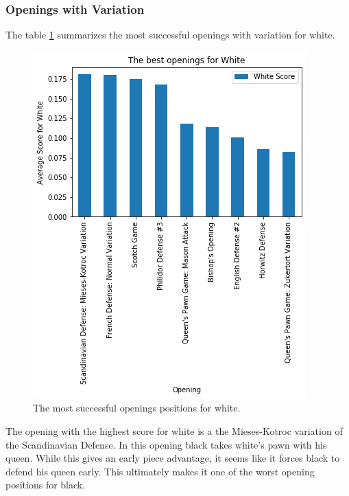 \documentclass[reprint,
 amsmath,amssymb,nobibnotes,
 aps, floatfix]{revtex4-1}
\begin{document}
\subsubsection{Openings with Variation}
The table \ref{fig:white_open} summarizes the most successful openings with variation for white.
\begin{figure}[h!]
    \centering
    \includegraphics[scale=.5]{openings_white.png}
    \caption{The most successful openings positions for white.}
    \label{fig:white_open}
\end{figure}

The opening with the highest score for white is a the Mieses-Kotroc variation of the Scandinavian Defense. In this opening black takes white's pawn with his queen. While this gives an early piece advantage, it seems like it forces black to defend his queen early. This ultimately makes it one of the worst opening positions for black.
\end{document}
